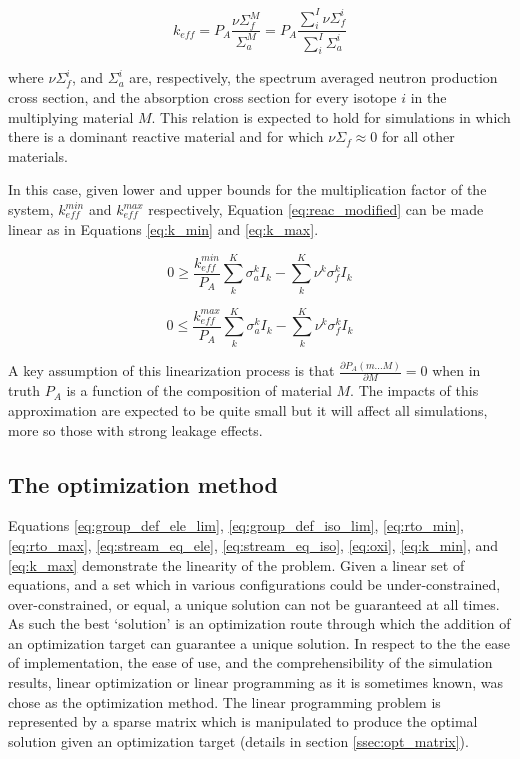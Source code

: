 \begin{equation}
\label{eq:reac_modified}
k_{eff} = P_{A} \frac{\nu\Sigma_{f}^{M}}{\Sigma_{a}^{M}} = P_{A} \frac{\sum\limits^{I}_{i}\nu\Sigma_{f}^{i}}{\sum\limits^{I}_{i}\Sigma_{a}^{i}}
\end{equation}

where $\nu\Sigma_{f}^i$, and $\Sigma_{a}^i$ are, respectively, the spectrum 
averaged neutron production cross section, and the absorption cross section for
every isotope $i$ in the multiplying material $M$. This relation is expected to
hold for simulations in which there is a dominant reactive material and for 
which $\nu\Sigma_{f} \approx 0$ for all other materials.

In this case, given lower and upper bounds for the multiplication factor of the
system, $k_{eff}^{min}$ and $k_{eff}^{max}$ respectively, 
Equation \ref{eq:reac_modified} can be  made linear as in 
Equations \ref{eq:k_min} and \ref{eq:k_max}.

\begin{equation}
\label{eq:k_min}
0 \geq \frac{k_{eff}^{min}}{P_{A}} \sum \limits_{k}^{K} \sigma_{a}^{k} I_{k} - \sum \limits_{k}^{K} \nu^{k} \sigma_{f}^{k} I_{k}
\end{equation}

\begin{equation}
\label{eq:k_max}
0 \leq \frac{k_{eff}^{max}}{P_{A}} \sum \limits_{k}^{K} \sigma_{a}^{k} I_{k} - \sum \limits_{k}^{K} \nu^{k} \sigma_{f}^{k} I_{k}
\end{equation}

A key assumption of this linearization process is that 
$\frac{\partial P_{A}(m...M)}{\partial M} = 0$ when in truth
$P_{A}$ is a function of the composition of material $M$. 
The impacts of this approximation are expected to be quite small but it will 
affect all simulations, more so those with strong leakage effects.
%

\subsection{The optimization method} \label{ssec:opt}
Equations \ref{eq:group_def_ele_lim}, \ref{eq:group_def_iso_lim}, 
\ref{eq:rto_min}, \ref{eq:rto_max}, \ref{eq:stream_eq_ele}, 
\ref{eq:stream_eq_iso}, \ref{eq:oxi}, \ref{eq:k_min}, and \ref{eq:k_max} 
demonstrate the linearity of the problem.  Given a linear
set of equations, and a set which in various configurations could be
under-constrained, over-constrained, or equal, a unique solution can not be
guaranteed at all times. As such the best `solution' is an optimization route
through which the addition of an optimization target can guarantee a unique
solution. In respect to the the ease of implementation, the ease of use, and
the comprehensibility of the simulation results,
linear optimization or linear programming as it is sometimes known, was
chose as the optimization method. The linear
programming problem is represented by a sparse matrix which is manipulated to 
produce the optimal solution given an optimization target 
(details in section \ref{ssec:opt_matrix}).



